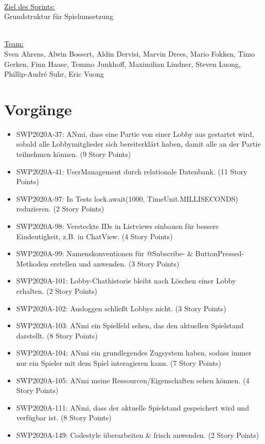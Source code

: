 \documentclass[12pt,a4paper, oneside]{article}
\begin{document}
    \noindent
    \\
    \underline{Ziel des Sprints:}
    \\
    Grundstruktur für Spielumsetzung

    \noindent
    \\
    \underline {Team:}
    \\
    Sven Ahrens, Alwin Bossert, Aldin Dervisi, Marvin Drees, Mario Fokken,
    Timo Gerken, Finn Haase, Temmo Junkhoff, Maximilian Lindner, Steven Luong,
    Phillip-André Suhr, Eric Vuong


    \section{Vorgänge}
    \begin{itemize}
        \item SWP2020A-37: ANmi, dass eine Partie von einer Lobby aus gestartet wird, sobald alle Lobbymitglieder sich bereiterklärt haben, damit alle an der Partie teilnehmen können. (9 Story Points)
        \item SWP2020A-41: UserManagement durch relationale Datenbank. (11 Story Points)
        \item SWP2020A-97: In Tests lock.await(1000, TimeUnit.MILLISECONDS) reduzieren. (2 Story Points)
        \item SWP2020A-98: Versteckte IDs in Listviews einbauen für bessere Eindeutigkeit, z.B. in ChatView. (4 Story Points)
        \item SWP2020A-99: Namenskonventionen für @Subscribe- \& ButtonPressed-Methoden erstellen und anwenden. (3 Story Points)
        \item SWP2020A-101: Lobby-Chathistorie bleibt nach Löschen einer Lobby erhalten. (2 Story Points)
        \item SWP2020A-102: Ausloggen schließt Lobbys nicht. (3 Story Points)
        \item SWP2020A-103: ANmi ein Spielfeld sehen, das den aktuellen Spielstand darstellt. (8 Story Points)
        \item SWP2020A-104: ANmi ein grundlegendes Zugsystem haben, sodass immer nur ein Spieler mit dem Spiel interagieren kann. (7 Story Points)
        \item SWP2020A-105: ANmi meine Ressourcen/Eigenschaften sehen können. (4 Story Points)
        \item SWP2020A-111: ANmi, dass der aktuelle Spielstand gespeichert wird und verfügbar ist. (8 Story Points)
        \item SWP2020A-149: Codestyle überarbeiten \& frisch anwenden. (2 Story Points)
    \end{itemize}
\end{document}
